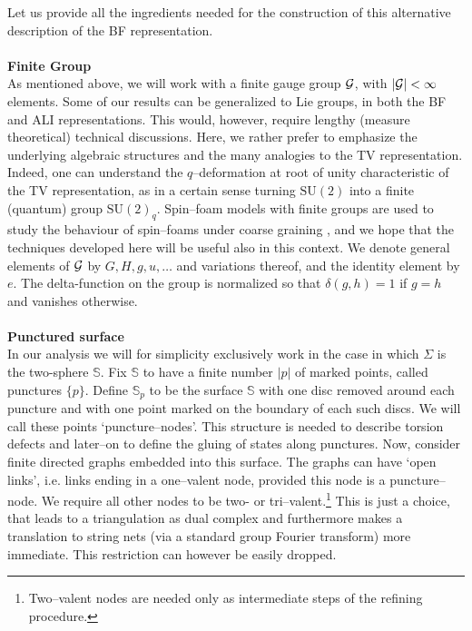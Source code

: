 \documentclass[nofootinbib,superscriptaddress,eqsecnum,tightenlines,11pt]{revtex4-1}
\def\SU{\text{SU}}
\renewcommand{\S}{{\mathbb S}}
\begin{document}
Let us  provide all the ingredients needed for the construction of this alternative description of the BF representation.\\
 
~\\
{\bf {Finite Group}}\\
As mentioned above, we will work with a finite gauge group ${\cal G}$, with $|{\cal G}|<\infty$ elements. 
Some of our results can be generalized to Lie groups, in both the BF and ALI representations. 
This would, however, require lengthy (measure theoretical) technical discussions.
Here, we rather prefer to emphasize the underlying algebraic structures and the many analogies to the TV representation. 
Indeed, one can understand the $q$--deformation at root of unity characteristic of the TV representation, as in a certain sense turning $\SU(2)$ into a finite (quantum) group $\SU(2)_q$. Spin--foam models with finite groups are  used to study the behaviour of spin--foams under coarse graining \cite{FiniteSF,Clement}, and we hope that the techniques developed here will be useful also in this context.
We denote general elements of $\cal G$ by $G,H,g,u,\dots$ and variations thereof, and the identity element by $e$.
The delta-function on the group is normalized so that $\delta(g,h)=1$ if $g=h$ and vanishes otherwise.\\
 \newpage
~\\
{\bf {Punctured surface}}\\
In our analysis we will for simplicity exclusively work in the case in which $\Sigma$ is the two-sphere $\mathbb{S}$.
Fix $\S$ to have a finite number $|p|$ of marked points, called punctures $\{p\}$.
Define $\S_p$ to be the surface $\S$ with one disc removed around each puncture and  with one point marked on the boundary of each such discs. 
We will call these points  `puncture--nodes'.
This structure is needed to describe torsion defects and later--on to define the gluing of states along punctures. 
Now, consider finite directed graphs embedded into this surface.
The graphs can have `open links', i.e. links ending in a one--valent node, provided this node is a puncture--node.
We require all other nodes to be two- or tri--valent.\footnote{Two--valent nodes are needed only as intermediate steps of the refining procedure.}
This is just a choice, that leads to a triangulation as dual complex and furthermore makes a translation to string nets (via a standard group Fourier transform) more immediate.  This restriction can however be easily dropped.
\end{document}
